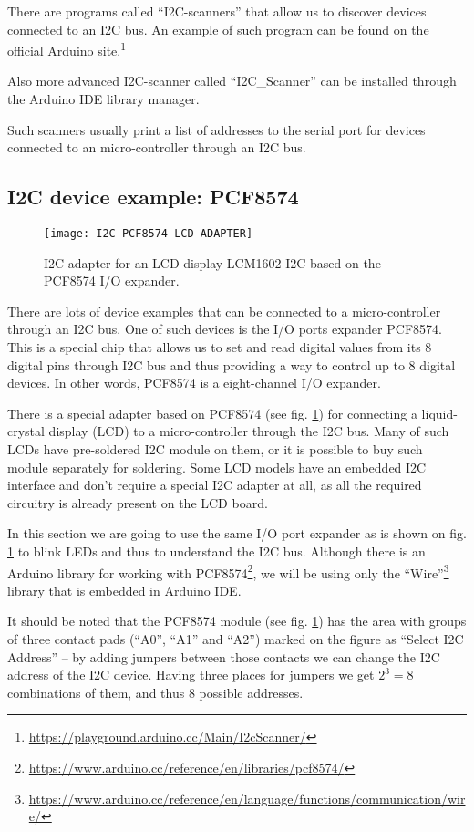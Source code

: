 \documentclass[../sparc.tex]{subfiles}
\begin{document}
There are programs called ``I2C-scanners'' that allow us to discover devices
connected to an I2C bus.  An example of such program can be found on the official Arduino site.\footnote{\url{https://playground.arduino.cc/Main/I2cScanner/}}

Also more advanced I2C-scanner called ``I2C\_Scanner'' can be installed through
the Arduino IDE library manager.

Such scanners usually print a list of addresses to the serial port for devices
connected to an micro-controller through an I2C bus.

\subsection{I2C device example: PCF8574}

\begin{figure}[H]
  \centering
  \texttt{[image: I2C-PCF8574-LCD-ADAPTER]}
  \caption{I2C-adapter for an LCD display LCM1602-I2C based on the PCF8574 I/O
    expander.}
  \label{fig:i2c-pcf8574-lcd-adapter}
\end{figure}

There are lots of device examples that can be connected to a micro-controller
through an \gls{I2C} bus.  One of such devices is the I/O ports expander
PCF8574.  This is a special chip that allows us to set and read digital values
from its 8 digital pins through I2C bus and thus providing a way to control up
to 8 digital devices.  In other words, PCF8574 is a eight-channel I/O expander.

There is a special adapter based on PCF8574 (see
fig. \ref{fig:i2c-pcf8574-lcd-adapter}) for connecting a liquid-crystal display
(LCD) to a micro-controller through the I2C bus.  Many of such LCDs have
pre-soldered I2C module on them, or it is possible to buy such module separately
for soldering.  Some LCD models have an embedded I2C interface and don't require
a special I2C adapter at all, as all the required circuitry is already present
on the LCD board.

In this section we are going to use the same I/O port expander as is shown on
fig. \ref{fig:i2c-pcf8574-lcd-adapter} to blink LEDs and thus to understand the
I2C bus.  Although there is an Arduino library for working with
PCF8574\footnote{\url{https://www.arduino.cc/reference/en/libraries/pcf8574/}},
we will be using only the
``Wire''\footnote{\url{https://www.arduino.cc/reference/en/language/functions/communication/wire/}}
library that is embedded in Arduino IDE.

It should be noted that the PCF8574 module (see
fig. \ref{fig:i2c-pcf8574-lcd-adapter}) has the area with groups of three
contact pads (``A0'', ``A1'' and ``A2'') marked on the figure as ``Select I2C
Address'' -- by adding jumpers between those contacts we can change the I2C
address of the I2C device.  Having three places for jumpers we get $2^3 = 8$
combinations of them, and thus 8 possible addresses.
\end{document}
